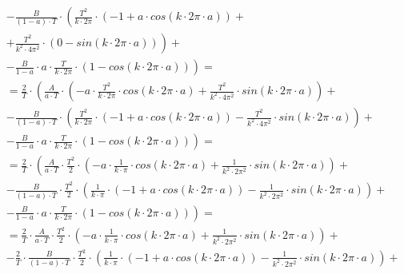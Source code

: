 \begin{task}
\begin{align*}
&-\left.\frac{B}{\left(1-a\right)\cdot T}\cdot \left( \frac{T^2}{k \cdot 2\pi} \cdot \left( -1 + a \cdot cos\left( k \cdot 2\pi \cdot a \right)\right) \right. \right.+ \\
&+ \left. \left. \frac{T^2}{k^2 \cdot 4\pi^2} \cdot \left(0 - sin\left( k \cdot 2\pi \cdot a\right)\right) \right)\right. +\\
&-\left. \frac{B}{1-a}\cdot a \cdot \frac{T}{k \cdot 2\pi} \cdot \left(1 - cos\left(k \cdot 2\pi \cdot a\right) \right)\right)=\\
&=\frac{2}{T}\cdot\left( \frac{A}{a \cdot T} \cdot \left( - a\cdot \frac{T^2}{k \cdot 2\pi} \cdot cos\left( k \cdot 2\pi \cdot a\right) + \frac{T^2}{k^2 \cdot 4\pi^2} \cdot sin\left(k \cdot 2\pi \cdot a\right) \right) \right. + \\
&-\left.\frac{B}{\left(1-a\right)\cdot T}\cdot \left( \frac{T^2}{k \cdot 2\pi} \cdot \left( -1 + a \cdot cos\left( k \cdot 2\pi \cdot a \right)\right) - \frac{T^2}{k^2 \cdot 4\pi^2} \cdot sin\left( k \cdot 2\pi \cdot a\right)\right) \right. +\\
&-\left. \frac{B}{1-a}\cdot a \cdot \frac{T}{k \cdot 2\pi} \cdot \left(1 - cos\left(k \cdot 2\pi \cdot a\right) \right)\right)=\\
&=\frac{2}{T}\cdot\left( \frac{A}{a \cdot T} \cdot \frac{T^2}{2} \cdot \left( - a\cdot \frac{1}{k \cdot \pi} \cdot cos\left( k \cdot 2\pi \cdot a\right) + \frac{1}{k^2 \cdot 2\pi^2} \cdot sin\left(k \cdot 2\pi \cdot a\right) \right) \right. + \\
&-\left.\frac{B}{\left(1-a\right)\cdot T}\cdot \frac{T^2}{2}\cdot\left( \frac{1}{k \cdot \pi} \cdot \left( -1 + a \cdot cos\left( k \cdot 2\pi \cdot a \right)\right) - \frac{1}{k^2 \cdot 2\pi^2} \cdot sin\left( k \cdot 2\pi \cdot a\right)\right) \right. +\\
&-\left. \frac{B}{1-a}\cdot a \cdot \frac{T}{k \cdot 2\pi} \cdot \left(1 - cos\left(k \cdot 2\pi \cdot a\right) \right)\right)=\\
&=\frac{2}{T}\cdot \frac{A}{a \cdot T} \cdot \frac{T^2}{2} \cdot \left( - a\cdot \frac{1}{k \cdot \pi} \cdot cos\left( k \cdot 2\pi \cdot a\right) + \frac{1}{k^2 \cdot 2\pi^2} \cdot sin\left(k \cdot 2\pi \cdot a\right) \right) + \\
&-\frac{2}{T}\cdot \frac{B}{\left(1-a\right)\cdot T}\cdot \frac{T^2}{2}\cdot\left( \frac{1}{k \cdot \pi} \cdot \left( -1 + a \cdot cos\left( k \cdot 2\pi \cdot a \right)\right) - \frac{1}{k^2 \cdot 2\pi^2} \cdot sin\left( k \cdot 2\pi \cdot a\right)\right) +\\

\end{align*}
\end{task}
